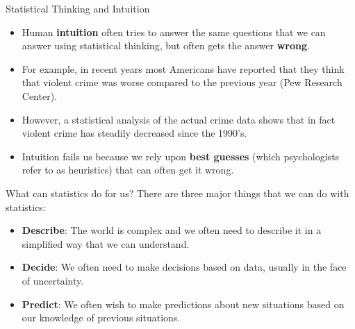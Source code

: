\documentclass[handout]{beamer}
\begin{document}
\begin{frame}{Statistical Thinking and Intuition}

\scriptsize{
\begin{itemize}
\item Human \textbf{intuition} often tries to answer the same questions that we can answer using statistical thinking, but often gets the answer \textbf{wrong}. 
\item For example, in recent years most Americans have reported that they think that violent crime was worse compared to the previous year (Pew Research Center). 
\item However, a statistical analysis of the actual crime data shows that in fact violent crime has steadily decreased since the 1990’s. 
\item Intuition fails us because we rely upon \textbf{best guesses} (which psychologists refer to as heuristics) that can often get it wrong. \cite{poldrack2019statistical}


\end{itemize}

}
 
\end{frame}


\begin{frame}{What can statistics do for us?}
There are three major things that we can do with statistics:

\begin{itemize}
\item \textbf{Describe}: The world is complex and we often need to describe it in a simplified way that we can understand.
\item \textbf{Decide}: We often need to make decisions based on data, usually in the face of uncertainty.
\item \textbf{Predict}: We often wish to make predictions about new situations based on our knowledge of previous situations.



\end{itemize}


 
\end{frame}
\end{document}
